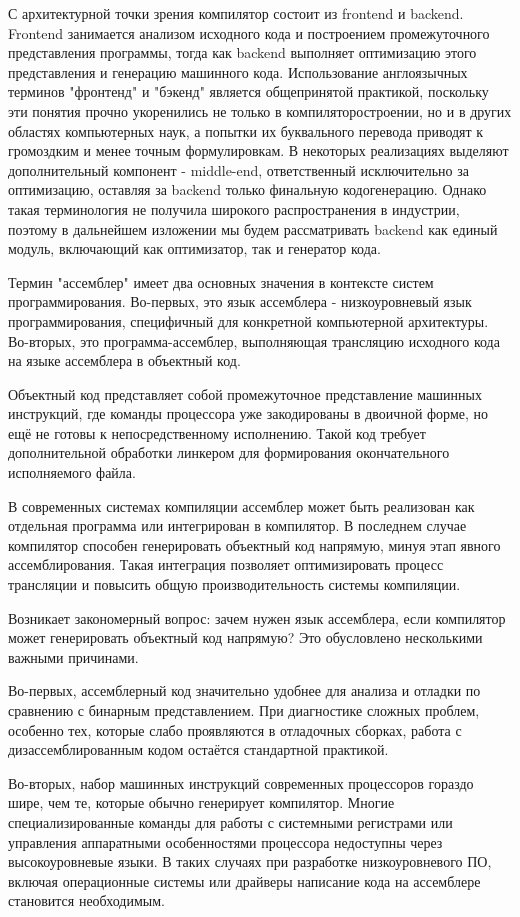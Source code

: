 С архитектурной точки зрения компилятор состоит из frontend и backend. Frontend занимается анализом исходного кода и построением промежуточного представления программы, тогда как backend выполняет оптимизацию этого представления и генерацию машинного кода. Использование англоязычных терминов "фронтенд" и "бэкенд" является общепринятой практикой, поскольку эти понятия прочно укоренились не только в компиляторостроении, но и в других областях компьютерных наук, а попытки их буквального перевода приводят к громоздким и менее точным формулировкам. В некоторых реализациях выделяют дополнительный компонент - middle-end, ответственный исключительно за оптимизацию, оставляя за backend только финальную кодогенерацию. Однако такая терминология не получила широкого распространения в индустрии, поэтому в дальнейшем изложении мы будем рассматривать backend как единый модуль, включающий как оптимизатор, так и генератор кода.

Термин "ассемблер" имеет два основных значения в контексте систем программирования. Во-первых, это язык ассемблера - низкоуровневый язык программирования, специфичный для конкретной компьютерной архитектуры. Во-вторых, это программа-ассемблер, выполняющая трансляцию исходного кода на языке ассемблера в объектный код.

Объектный код представляет собой промежуточное представление машинных инструкций, где команды процессора уже закодированы в двоичной форме, но ещё не готовы к непосредственному исполнению. Такой код требует дополнительной обработки линкером для формирования окончательного исполняемого файла.

В современных системах компиляции ассемблер может быть реализован как отдельная программа или интегрирован в компилятор. В последнем случае компилятор способен генерировать объектный код напрямую, минуя этап явного ассемблирования. Такая интеграция позволяет оптимизировать процесс трансляции и повысить общую производительность системы компиляции.

Возникает закономерный вопрос: зачем нужен язык ассемблера, если компилятор может генерировать объектный код напрямую? Это обусловлено несколькими важными причинами.

Во-первых, ассемблерный код значительно удобнее для анализа и отладки по сравнению с бинарным представлением. При диагностике сложных проблем, особенно тех, которые слабо проявляются в отладочных сборках, работа с дизассемблированным кодом остаётся стандартной практикой.

Во-вторых, набор машинных инструкций современных процессоров гораздо шире, чем те, которые обычно генерирует компилятор. Многие специализированные команды  для работы с системными регистрами или управления аппаратными особенностями процессора недоступны через высокоуровневые языки. В таких случаях при разработке низкоуровневого ПО, включая операционные системы или драйверы написание кода на ассемблере становится необходимым.

